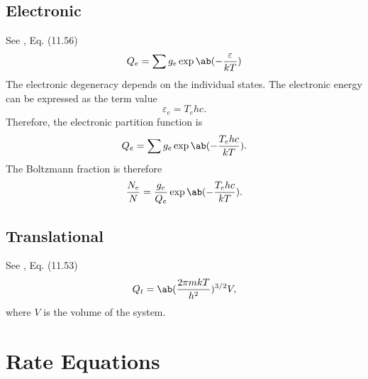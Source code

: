 \documentclass[11pt, twoside, fleqn]{report}
\begin{document}
\subsection{Electronic}

See \cite{andersonHypersonicHighTemperatureGas2019}, Eq. (11.56)
\begin{equation*}
    Q_e = \sum g_e\exp\ab(-\frac{\varepsilon}{kT})
\end{equation*}
The electronic degeneracy depends on the individual states. The electronic energy can be expressed as the term value
\begin{equation*}
    \varepsilon_e = T_ehc.
\end{equation*}
Therefore, the electronic partition function is
\begin{equation*}
    Q_e = \sum g_e\exp\ab(-\frac{T_ehc}{kT}).
\end{equation*}
The Boltzmann fraction is therefore
\begin{equation*}
    \frac{N_e}{N} = \frac{g_e}{Q_e}\exp\ab(-\frac{T_ehc}{kT}).
\end{equation*}

\subsection{Translational}

See \cite{andersonHypersonicHighTemperatureGas2019}, Eq. (11.53)
\begin{equation*}
    Q_t = \ab(\frac{2\pi mkT}{h^2})^{3/2}V,
\end{equation*}
where $V$ is the volume of the system.

\section{Rate Equations}
\end{document}
